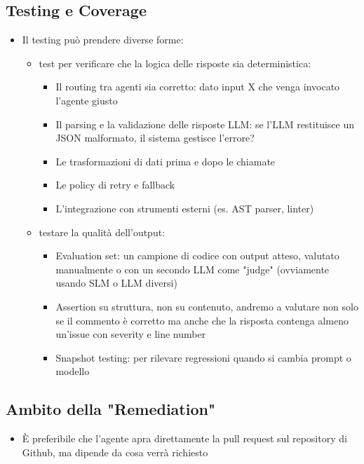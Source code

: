 \subsection{Testing e Coverage}
\begin{itemize}
	\item Il testing può prendere diverse forme:
		\begin{itemize}
			\item test per verificare che la logica delle risposte sia deterministica:
				\begin{itemize}
					\item Il routing tra agenti sia corretto: dato input X che venga invocato l'agente giusto
					\item Il parsing e la validazione delle risposte LLM: se l'LLM restituisce un JSON malformato, il sistema gestisce l'errore?
					\item Le trasformazioni di dati prima e dopo le chiamate
					\item Le policy di retry e fallback
					\item L'integrazione con strumenti esterni (es. AST parser, linter)
				\end{itemize}
			\item testare la qualità dell'output:
				\begin{itemize}
					\item Evaluation set: un campione di codice con output atteso, valutato manualmente o con un secondo LLM come "judge" (ovviamente usando SLM o LLM diversi)
					\item Assertion su struttura, non su contenuto, andremo a valutare non solo se il commento è corretto ma anche che la risposta contenga almeno un'issue con severity e line number
					\item Snapshot testing: per rilevare regressioni quando si cambia prompt o modello
				\end{itemize}
		\end{itemize}
\end{itemize}

\subsection{Ambito della "Remediation"}
\begin{itemize}
	\item È preferibile che l'agente apra direttamente la pull request sul repository di Github, ma dipende da cosa verrà richiesto
\end{itemize}

